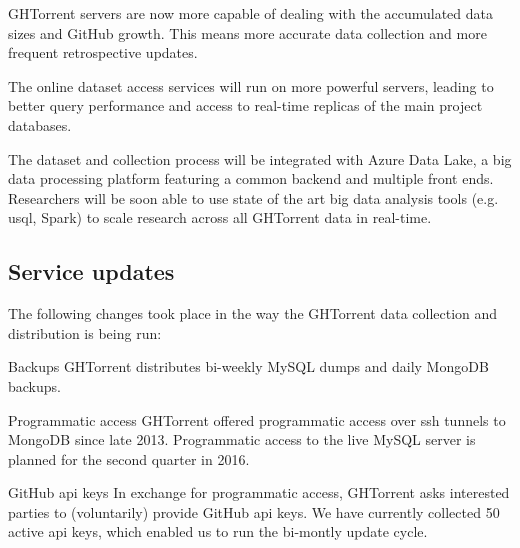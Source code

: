 \documentclass{sig-alternate}
\begin{document}
\begin{compactitem}

  \item GHTorrent servers are now more capable of dealing with the accumulated
    data sizes and GitHub growth. This means more accurate data collection
    and more frequent retrospective updates.

  \item The online dataset access services will run on more powerful servers,
    leading to better query performance and access to real-time replicas of
    the main project databases.

  \item The dataset and collection process will be integrated with Azure
    Data Lake, a big data processing platform featuring a common backend
    and multiple front ends. Researchers will be soon able to use state
    of the art big data analysis tools (e.g. {\sc usql}, Spark) to scale
    research across all GHTorrent data in real-time.

\end{compactitem}


\subsection{Service updates}

The following changes took place in the way the GHTorrent data collection
and distribution is being run:

\begin{compactdesc}

  \item[Backups] GHTorrent distributes bi-weekly MySQL dumps and daily MongoDB
    backups.

  \item[Programmatic access] GHTorrent offered programmatic access over
    {\sc ssh} tunnels to MongoDB since late 2013. Programmatic access to the
    live MySQL server is planned for the second quarter in 2016.

  \item[GitHub {\sc api} keys] In exchange for programmatic access, GHTorrent
    asks interested parties to (voluntarily) provide GitHub {\sc api} keys. We
    have currently collected 50 active {\sc api} keys, which enabled us to run
    the bi-montly update cycle.

\end{compactdesc}

\end{document}
